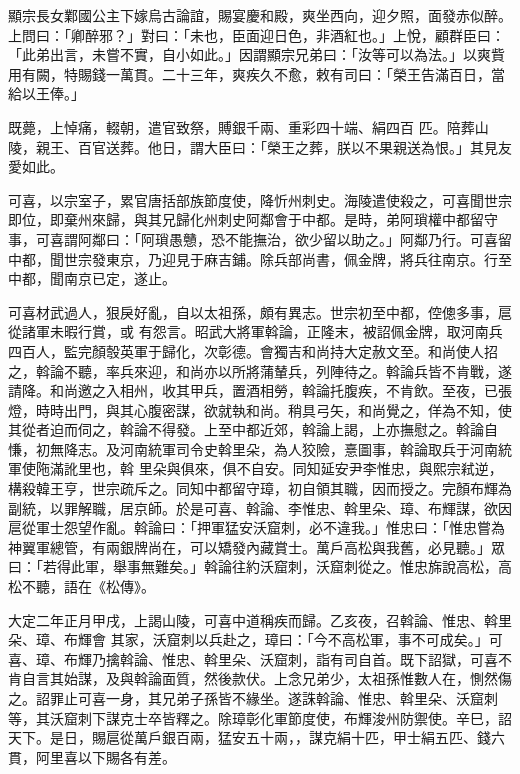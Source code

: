 \begin{pinyinscope}
 顯宗長女鄴國公主下嫁烏古論誼，賜宴慶和殿，爽坐西向，迎夕照，面發赤似醉。上問曰：「卿醉邪？」對曰：「未也，臣面迎日色，非酒紅也。」上悅，顧群臣曰：「此弟出言，未嘗不實，自小如此。」因謂顯宗兄弟曰：「汝等可以為法。」以爽貲用有闕，特賜錢一萬貫。二十三年，爽疾久不愈，敕有司曰：「榮王告滿百日，當給以王俸。」



 既薨，上悼痛，輟朝，遣官致祭，賻銀千兩、重彩四十端、絹四百
 匹。陪葬山陵，親王、百官送葬。他日，謂大臣曰：「榮王之葬，朕以不果親送為恨。」其見友愛如此。



 可喜，以宗室子，累官唐括部族節度使，降忻州刺史。海陵遣使殺之，可喜聞世宗即位，即棄州來歸，與其兄歸化州刺史阿鄰會于中都。是時，弟阿瑣權中都留守事，可喜謂阿鄰曰：「阿瑣愚戇，恐不能撫治，欲少留以助之。」阿鄰乃行。可喜留中都，聞世宗發東京，乃迎見于麻吉鋪。除兵部尚書，佩金牌，將兵往南京。行至中都，聞南京已定，遂止。



 可喜材武過人，狠戾好亂，自以太祖孫，頗有異志。世宗初至中都，倥傯多事，扈從諸軍未暇行賞，或
 有怨言。昭武大將軍斡論，正隆末，被詔佩金牌，取河南兵四百人，監完顏彀英軍于歸化，次彰德。會獨吉和尚持大定赦文至。和尚使人招之，斡論不聽，率兵來迎，和尚亦以所將蒲輦兵，列陣待之。斡論兵皆不肯戰，遂請降。和尚邀之入相州，收其甲兵，置酒相勞，斡論托腹疾，不肯飲。至夜，已張燈，時時出門，與其心腹密謀，欲就執和尚。稍具弓矢，和尚覺之，佯為不知，使其從者迫而伺之，斡論不得發。上至中都近郊，斡論上謁，上亦撫慰之。斡論自慊，初無降志。及河南統軍司令史斡里朵，為人狡險，憙圖事，斡論取兵于河南統軍使陁滿訛里也，斡
 里朵與俱來，俱不自安。同知延安尹李惟忠，與熙宗弒逆，構殺韓王亨，世宗疏斥之。同知中都留守璋，初自領其職，因而授之。完顏布輝為副統，以罪解職，居京師。於是可喜、斡論、李惟忠、斡里朵、璋、布輝謀，欲因扈從軍士怨望作亂。斡論曰：「押軍猛安沃窟刺，必不違我。」惟忠曰：「惟忠嘗為神翼軍總管，有兩銀牌尚在，可以矯發內藏賞士。萬戶高松與我舊，必見聽。」眾曰：「若得此軍，舉事無難矣。」斡論往約沃窟刺，沃窟刺從之。惟忠旆說高松，高松不聽，語在《松傳》。



 大定二年正月甲戌，上謁山陵，可喜中道稱疾而歸。乙亥夜，召斡論、惟忠、斡里朵、璋、布輝會
 其家，沃窟刺以兵赴之，璋曰：「今不高松軍，事不可成矣。」可喜、璋、布輝乃擒斡論、惟忠、斡里朵、沃窟刺，詣有司自首。既下詔獄，可喜不肯自言其始謀，及與斡論面質，然後款伏。上念兄弟少，太祖孫惟數人在，惻然傷之。詔罪止可喜一身，其兄弟子孫皆不緣坐。遂誅斡論、惟忠、斡里朵、沃窟刺等，其沃窟刺下謀克士卒皆釋之。除璋彰化軍節度使，布輝浚州防禦使。辛巳，詔天下。是日，賜扈從萬戶銀百兩，猛安五十兩，，謀克絹十匹，甲士絹五匹、錢六貫，阿里喜以下賜各有差。




\end{pinyinscope}

